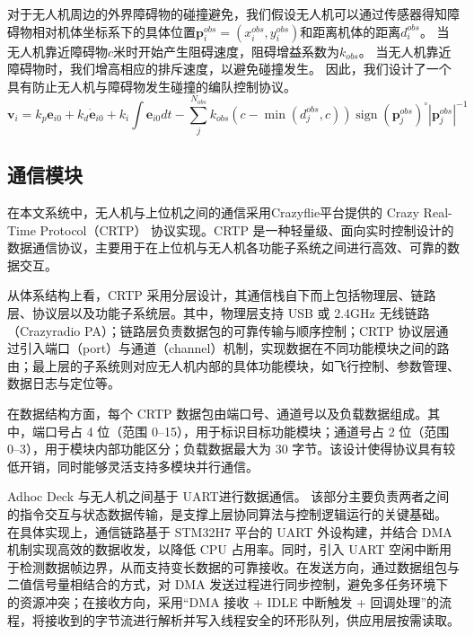 对于无人机周边的外界障碍物的碰撞避免，我们假设无人机可以通过传感器得知障碍物相对机体坐标系下的具体位置$ \boldsymbol{p}_{i}^{o b s}=\left(x_{i}^{o b s}, y_{i}^{o b s}\right)$和距离机体的距离$d_{i}^{o b s}$。
当无人机靠近障碍物$c$米时开始产生阻碍速度，阻碍增益系数为$k_{o b s}$。
当无人机靠近障碍物时，我们增高相应的排斥速度，以避免碰撞发生。
因此，我们设计了一个具有防止无人机与障碍物发生碰撞的编队控制协议。
\begin{equation}
\boldsymbol{v}_{i}=k_{p} \boldsymbol{e}_{i 0}+k_{d} \dot{\boldsymbol{e}}_{i 0}+k_{i} \int \boldsymbol{e}_{i 0} d t-\sum_{j}^{N_{o b s}} k_{o b s}\left(c-\min \left(d_{j}^{o b s}, c\right)\right) \operatorname{sign}\left(\boldsymbol{p}_{j}^{o b s}\right)^{\circ}\left|\boldsymbol{p}_{j}^{o b s}\right|^{-1}
\end{equation}
\subsection{通信模块}
在本文系统中，无人机与上位机之间的通信采用Crazyflie平台提供的 Crazy Real-Time Protocol（CRTP） 协议实现。CRTP 是一种轻量级、面向实时控制设计的数据通信协议，主要用于在上位机与无人机各功能子系统之间进行高效、可靠的数据交互。

从体系结构上看，CRTP 采用分层设计，其通信栈自下而上包括物理层、链路层、协议层以及功能子系统层。其中，物理层支持 USB 或 2.4GHz 无线链路（Crazyradio PA）；链路层负责数据包的可靠传输与顺序控制；CRTP 协议层通过引入端口（port）与通道（channel）机制，实现数据在不同功能模块之间的路由；最上层的子系统则对应无人机内部的具体功能模块，如飞行控制、参数管理、数据日志与定位等。

在数据结构方面，每个 CRTP 数据包由端口号、通道号以及负载数据组成。其中，端口号占 4 位（范围 0–15），用于标识目标功能模块；通道号占 2 位（范围 0–3），用于模块内部功能区分；负载数据最大为 30 字节。该设计使得协议具有较低开销，同时能够灵活支持多模块并行通信。

Adhoc Deck 与无人机之间基于 UART进行数据通信。
该部分主要负责两者之间的指令交互与状态数据传输，是支撑上层协同算法与控制逻辑运行的关键基础。
在具体实现上，通信链路基于 STM32H7 平台的 UART 外设构建，并结合 DMA 机制实现高效的数据收发，以降低 CPU 占用率。同时，引入 UART 空闲中断用于检测数据帧边界，从而支持变长数据的可靠接收。在发送方向，通过数据组包与二值信号量相结合的方式，对 DMA 发送过程进行同步控制，避免多任务环境下的资源冲突；在接收方向，采用“DMA 接收 + IDLE 中断触发 + 回调处理”的流程，将接收到的字节流进行解析并写入线程安全的环形队列，供应用层按需读取。

